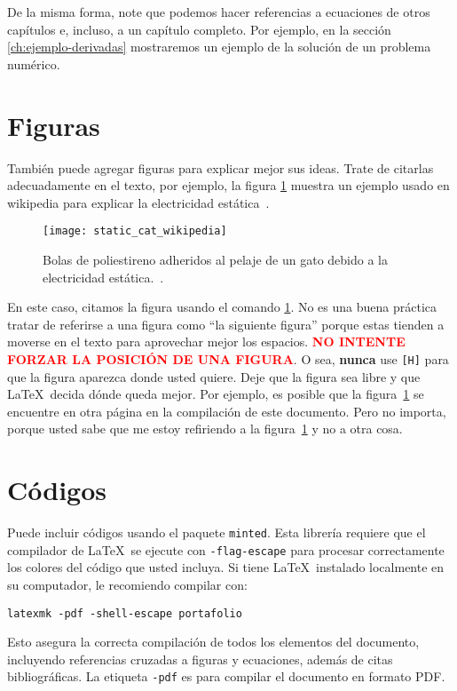\documentclass[../portafolio.tex]{subfiles}
\begin{document}
De la misma forma, note que podemos hacer referencias a ecuaciones de otros capítulos e, incluso, a un capítulo completo. Por ejemplo, en la sección \ref{ch:ejemplo-derivadas} mostraremos un ejemplo de la solución de un problema numérico.

\section{Figuras}
También puede agregar figuras para explicar mejor sus ideas. Trate de
citarlas adecuadamente en el texto, por ejemplo, la figura
\ref{fig:estatica} muestra un ejemplo usado en wikipedia
para explicar la electricidad estática~\cite{wikistatic}.
\begin{figure}[ht!]
  \centering
  \texttt{[image: static\_cat\_wikipedia]}
  \caption{Bolas de poliestireno adheridos al pelaje de un gato debido
    a la electricidad estática.~\cite{wikistatic}.}
  \label{fig:estatica}
\end{figure}

En este caso, citamos la figura usando el comando \texttt{\ref{fig:estatica}}. No es una buena práctica tratar de referirse a una figura como ``la siguiente figura'' porque estas tienden a moverse en el texto para aprovechar mejor los espacios. \textcolor{red}{\bf NO INTENTE FORZAR LA POSICIÓN DE UNA FIGURA}. O sea, \textbf{nunca} use \texttt{[H]} para que la figura aparezca donde usted quiere. Deje que la figura sea libre y que \LaTeX\ decida dónde queda mejor. Por ejemplo, es posible que la figura~\ref{fig:estatica} se encuentre en otra página en la compilación de este documento. Pero no importa, porque usted sabe que me estoy refiriendo a la figura~\ref{fig:estatica} y no a otra cosa.


\section{Códigos}
Puede incluir códigos usando el paquete \texttt{minted}. Esta librería
requiere que el compilador de \LaTeX\ se ejecute con
\texttt{-flag-escape} para procesar correctamente los colores del
código que usted incluya. Si tiene \LaTeX\ instalado localmente en su
computador, le recomiendo compilar con:
\begin{verbatim}
latexmk -pdf -shell-escape portafolio 
\end{verbatim}
% 
Esto asegura la correcta compilación de todos los elementos del
documento, incluyendo referencias cruzadas a figuras y ecuaciones,
además de citas bibliográficas. La etiqueta \texttt{-pdf} es para
compilar el documento en formato PDF.
\end{document}
